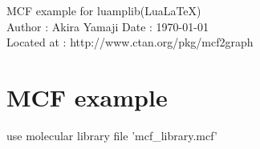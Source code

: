 \documentclass{article}
\begin{document}
\begin{center}
 {\Huge\sf MCF example for luamplib(Lua\LaTeX)}\vspace{5mm}\\
 Author : Akira Yamaji \quad Date : \today\\
 Located at : http://www.ctan.org/pkg/mcf2graph\vspace{2mm}\\
\end{center}
\section{MCF example}
\noindent%
 use molecular library file 'mcf\_library.mcf' \\
\end{document}
